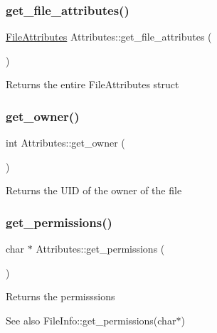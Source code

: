 \subsubsection{\texorpdfstring{get\+\_\+file\+\_\+attributes()}{get\_file\_attributes()}}
{\footnotesize\ttfamily \mbox{\hyperlink{structfile__attributes}{File\+Attributes}} Attributes\+::get\+\_\+file\+\_\+attributes (\begin{DoxyParamCaption}{ }\end{DoxyParamCaption})}

\begin{DoxyReturn}{Returns}
the entire File\+Attributes struct 
\end{DoxyReturn}
\mbox{\label{classAttributes_a8b9efe0186ccf74b4b08c4031a99f5bb}} 
\subsubsection{\texorpdfstring{get\+\_\+owner()}{get\_owner()}}
{\footnotesize\ttfamily int Attributes\+::get\+\_\+owner (\begin{DoxyParamCaption}{ }\end{DoxyParamCaption})}

\begin{DoxyReturn}{Returns}
the U\+ID of the owner of the file 
\end{DoxyReturn}
\mbox{\label{classAttributes_a52a8dc1b5d9c4c1eb19bcb336705cc42}} 
\subsubsection{\texorpdfstring{get\+\_\+permissions()}{get\_permissions()}}
{\footnotesize\ttfamily char $\ast$ Attributes\+::get\+\_\+permissions (\begin{DoxyParamCaption}{ }\end{DoxyParamCaption})}

\begin{DoxyReturn}{Returns}
the permisssions 
\end{DoxyReturn}
\begin{DoxySeeAlso}{See also}
File\+Info\+::get\+\_\+permissions(char$\ast$) 
\end{DoxySeeAlso}
\mbox{\label{classAttributes_a6e5df8252fc902c0fbe22058fe0b4fb1}} 
